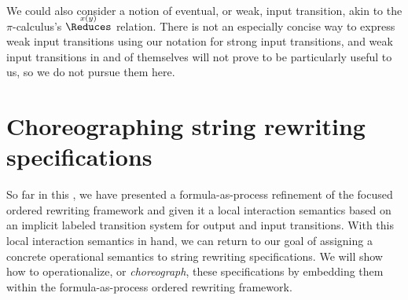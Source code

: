 We could also consider a notion of eventual, or weak, input transition, akin to the $\pi$-calculus's $\overset{\smash{x(y)}}{\Reduces}$ relation.
There is not an especially concise way to express weak input transitions using our notation for strong input transitions, and weak input transitions in and of themselves will not prove to be particularly useful to us, so we do not pursue them here.


\clearpage
\section{Choreographing string rewriting specifications}\label{sec:formula-as-process:choreographies}\label{sec:choreographies:choreographies}

So far in this , we have presented a formula-as-process refinement of the focused ordered rewriting framework and given it a local interaction semantics based on an implicit labeled transition system for output and input transitions.
With this local interaction semantics in hand, we can return to our goal of assigning a concrete operational semantics to string rewriting specifications.
We will show how to operationalize, or \emph{choreograph}, these specifications by embedding them within the formula-as-process ordered rewriting framework.


